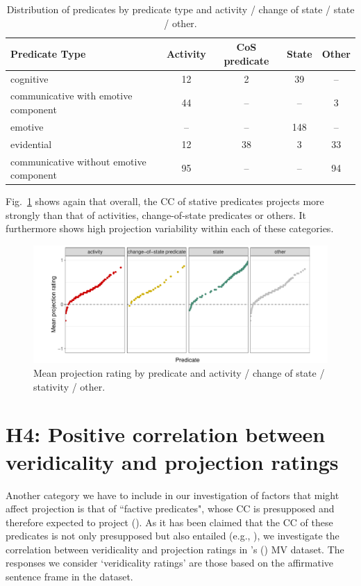 \documentclass[11pt,fleqn]{article}
\newcommand{\figref}[1]{Fig.~\ref{#1}}
\newcommand{\6}{\mbox{$[\hspace*{-.6mm}[$}}
\newcommand{\9}{\mbox{$]\hspace*{-.6mm}]$}}
\newcommand{\citepos}[1]{\citeauthor{#1}'s (\citeyear{#1})}
\begin{document}
\begin{table}[H]
	\centering
	\begin{tabular}{l|c|c|c|c} 
		Predicate Type & Activity & CoS predicate & State & Other \\ 
		\hline
		cognitive & 12 & 2 & 39 & -- \\
		communicative with emotive component & 44 & -- & -- & 3 \\
		emotive & -- & -- & 148 & -- \\
		evidential & 12 & 38 & 3 & 33 \\
		communicative without emotive component & 95 & -- & -- & 94 \\
	\end{tabular}
	\caption{Distribution of predicates by predicate type and activity / change of state / state / other.}
	\label{acossdistribution}
\end{table}

\figref{projcombfac} shows again that overall, the CC of stative predicates projects more strongly than that of activities, change-of-state predicates or others. It furthermore shows high projection variability within each of these categories.

\begin{figure}[H]
	\centering
	\includegraphics[width=.8\textwidth]{projection-by-predicate-stateActivityCoS-faceted}
	\caption{Mean projection rating by predicate and activity / change of state / stativity / other.}
	\label{projcombfac}
\end{figure}


\section{H4: Positive correlation between veridicality and projection ratings}
Another category we have to include in our investigation of factors that might affect projection is that of ``factive predicates", whose CC is presupposed and therefore expected to project (\citealt{kiparsky-kiparsky70}). As it has been claimed that the CC of these predicates is not only presupposed but also entailed (e.g., \citealt{anand-hacquard2014}), we investigate the correlation between veridicality and projection ratings in \citepos{white-rawlins-nels2018} MV dataset. The responses we consider `veridicality ratings' are those based on the affirmative sentence frame in the dataset.
\end{document}
